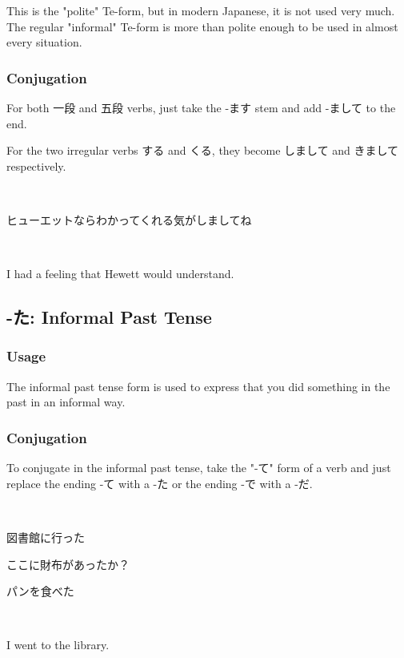 \documentclass{article}
\begin{document}
\begin{CJK}{UTF8}{min}
This is the "polite" Te-form, but in modern Japanese, it is not used very much. The regular "informal" Te-form is more than polite enough to be used in almost every situation.

\subsubsection{Conjugation}

For both 一段 and 五段 verbs, just take the -ます stem and add -まして to the end. 

For the two irregular verbs する and くる, they become しまして and きまして respectively.
\begin{example}
\ 

ヒューエットならわかってくれる気がしましてね
\end{example}

\begin{solution}
\ 

I had a feeling that Hewett would understand. 
\end{solution}

\subsection{-た: Informal Past Tense}
\subsubsection{Usage}

The informal past tense form is used to express that you did something in the past in an informal way.

\subsubsection{Conjugation}

To conjugate in the informal past tense, take the "-て" form of a verb and just replace the ending -て with a -た or the ending -で with a -だ.

\begin{example}
    \ 

図書館に行った

ここに財布があったか？

パンを食べた
\end{example}

\begin{solution}
    \ 

I went to the library.


\end{solution}
\end{CJK}
\end{document}
